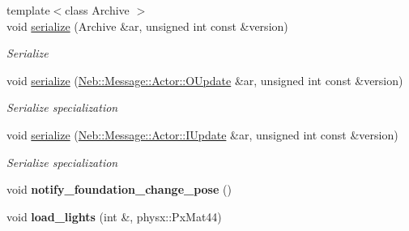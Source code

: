 \begin{DoxyCompactItemize}
\item 
{\footnotesize template$<$class Archive $>$ }\\void \hyperlink{classNeb_1_1Actor_1_1Base_a1b1e7cf679c2cb84e532deed6a2ec90c}{serialize} (\-Archive \&ar, unsigned int const \&version)
\begin{DoxyCompactList}\small\item\em \-Serialize \end{DoxyCompactList}\item 
\hypertarget{classNeb_1_1Actor_1_1Base_a7ee74ffdae30690b3d874a174e333e7f}{void \hyperlink{classNeb_1_1Actor_1_1Base_a7ee74ffdae30690b3d874a174e333e7f}{serialize} (\hyperlink{structNeb_1_1Message_1_1Actor_1_1OUpdate}{\-Neb\-::\-Message\-::\-Actor\-::\-O\-Update} \&ar, unsigned int const \&version)}\label{classNeb_1_1Actor_1_1Base_a7ee74ffdae30690b3d874a174e333e7f}

\begin{DoxyCompactList}\small\item\em \-Serialize specialization \end{DoxyCompactList}\item 
\hypertarget{classNeb_1_1Actor_1_1Base_aedee981b6f4c1123f7cc3d73295cdcbe}{void \hyperlink{classNeb_1_1Actor_1_1Base_aedee981b6f4c1123f7cc3d73295cdcbe}{serialize} (\hyperlink{structNeb_1_1Message_1_1Actor_1_1IUpdate}{\-Neb\-::\-Message\-::\-Actor\-::\-I\-Update} \&ar, unsigned int const \&version)}\label{classNeb_1_1Actor_1_1Base_aedee981b6f4c1123f7cc3d73295cdcbe}

\begin{DoxyCompactList}\small\item\em \-Serialize specialization \end{DoxyCompactList}\item 
\hypertarget{classNeb_1_1Actor_1_1Base_a5b5263db439a6cc2614268dd9058d302}{void {\bfseries notify\-\_\-foundation\-\_\-change\-\_\-pose} ()}\label{classNeb_1_1Actor_1_1Base_a5b5263db439a6cc2614268dd9058d302}

\item 
\hypertarget{classNeb_1_1Actor_1_1Base_a1952504069949fa29f53137cfe762274}{void {\bfseries load\-\_\-lights} (int \&, physx\-::\-Px\-Mat44)}\label{classNeb_1_1Actor_1_1Base_a1952504069949fa29f53137cfe762274}

\end{DoxyCompactItemize}
